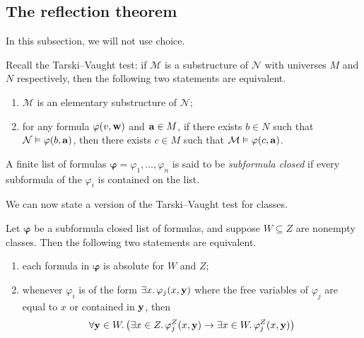 \subsection{The reflection theorem}
In this subsection, we will not use choice.

Recall the Tarski--Vaught test: if \( \mathcal M \) is a substructure of \( \mathcal N \) with universes \( M \) and \( N \) respectively, then the following two statements are equivalent.
\begin{enumerate}
    \item \( \mathcal M \) is an elementary substructure of \( \mathcal N \);
    \item for any formula \( \varphi(v, \vb w) \) and \( \vb a \in M \), if there exists \( b \in N \) such that \( \mathcal N \vDash \varphi(b, \vb a) \), then there exists \( c \in M \) such that \( \mathcal M \vDash \varphi(c, \vb a) \).
\end{enumerate}
\begin{definition}
    A finite list of formulas \( \bm\varphi = \varphi_1, \dots, \varphi_n \) is said to be \emph{subformula closed} if every subformula of the \( \varphi_i \) is contained on the list.
\end{definition}
We can now state a version of the Tarski--Vaught test for classes.
\begin{lemma}
    Let \( \bm\varphi \) be a subformula closed list of formulas, and suppose \( W \subseteq Z \) are nonempty classes.
    Then the following two statements are equivalent.
    \begin{enumerate}
        \item each formula in \( \bm\varphi \) is absolute for \( W \) and \( Z \);
        \item whenever \( \varphi_i \) is of the form \( \exists x.\, \varphi_j(x, \vb y) \) where the free variables of \( \varphi_j \) are equal to \( x \) or contained in \( \vb y \), then
        \[ \forall \vb y \in W.\, \qty(\exists x \in Z.\, \varphi_j^Z(x, \vb y) \to \exists x \in W.\, \varphi_j^Z(x, \vb y)) \]
    \end{enumerate}
\end{lemma}
